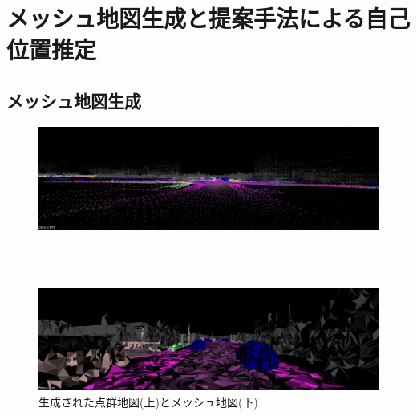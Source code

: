 \documentclass[letterpaper, 9 pt, conference]{ieeeconf}
\begin{document}
\section{メッシュ地図生成と提案手法による自己位置推定}

\subsection{メッシュ地図生成}

\begin{figure}[htbp]
 \begin{minipage}[b]{1.0\hsize}
 \begin{center}
  \includegraphics[keepaspectratio, scale=0.19]{./picture/pointmap_image8.jpg}
  \end{center}
 \end{minipage} \\ \\
 \begin{minipage}[b]{1.0\hsize}
 \begin{center}
  \includegraphics[keepaspectratio, scale=0.19]{./picture/meshmap_image8.jpg}
  \end{center}
 \end{minipage}
 \caption{生成された点群地図(上)とメッシュ地図(下)}\label{fig:map}
\end{figure}
\end{document}
